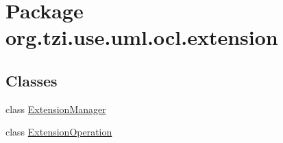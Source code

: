 \hypertarget{namespaceorg_1_1tzi_1_1use_1_1uml_1_1ocl_1_1extension}{\section{Package org.\-tzi.\-use.\-uml.\-ocl.\-extension}
\label{namespaceorg_1_1tzi_1_1use_1_1uml_1_1ocl_1_1extension}
}
\subsection*{Classes}
\begin{DoxyCompactItemize}
\item 
class \hyperlink{classorg_1_1tzi_1_1use_1_1uml_1_1ocl_1_1extension_1_1_extension_manager}{Extension\-Manager}
\item 
class \hyperlink{classorg_1_1tzi_1_1use_1_1uml_1_1ocl_1_1extension_1_1_extension_operation}{Extension\-Operation}
\end{DoxyCompactItemize}
